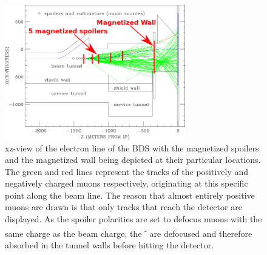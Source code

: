 \documentclass[12pt]{article}
\begin{document}
\begin{figure}
    \centering
    \includegraphics[width=0.7\textwidth]{figures/BDS_Tunnel_Spoilers+Wall.png}
    \caption[BDS tunnel with the spoiler and wall positions]{
    xz-view of the electron line of the BDS with the magnetized spoilers and the magnetized wall being depicted at their particular locations.
    The green and red lines represent the tracks of the positively and negatively charged muons respectively, originating at this specific point along the beam line.
    The reason that almost entirely positive muons are drawn is that only tracks that reach the detector are displayed.
    As the spoiler polarities are set to defocus muons with the same charge as the beam charge, the \textmu\textsuperscript{-} are defocused and therefore absorbed in the tunnel walls before hitting the detector.
    }
    \label{fig:Spoilers_Wall_Locations}
\end{figure}
\end{document}
